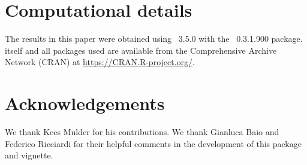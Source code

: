 \documentclass[nojss]{jss}
\begin{document}
\section*{Computational details}

The results in this paper were obtained using
~3.5.0 with the
~0.3.1.900 package.  itself
and all packages used are available from the Comprehensive
 Archive Network (CRAN) at
\url{https://CRAN.R-project.org/}.


\section*{Acknowledgements}
We thank Kees Mulder for his contributions. We thank Gianluca Baio and Federico Ricciardi for their helpful comments in the development of this package and vignette.


\end{document}
